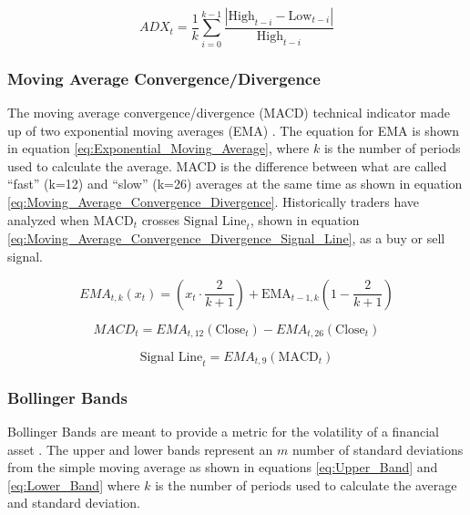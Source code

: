 \documentclass[journal]{new-aiaa}
\begin{document}
\begin{equation}\label{eq:Average_Directional_Index}
        ADX_t = \frac{1}{k} \sum_{i=0}^{k-1} \frac{\left| \text{High}_{t-i} - \text{Low}_{t-i} \right|}{\text{High}_{t-i}}
\end{equation}

\subsubsection{Moving Average Convergence/Divergence}\label{sec:Technical_Analysis:Moving_Average_Convergence_Divergence}
The moving average convergence/divergence (MACD) technical indicator made up of two exponential moving averages (EMA) \cite{appel2005technical}.
The equation for EMA is shown in equation \ref{eq:Exponential_Moving_Average}, where $k$ is the number of periods used to calculate the average.
MACD is the difference between what are called  ``fast'' (k=12) and ``slow'' (k=26) averages at the same time as shown in equation \ref{eq:Moving_Average_Convergence_Divergence}.
Historically traders have analyzed when $\text{MACD}_t$ crosses $\text{Signal Line}_t$, shown in equation \ref{eq:Moving_Average_Convergence_Divergence_Signal_Line}, as a buy or sell signal.

\begin{equation}\label{eq:Exponential_Moving_Average}
        EMA_{t,k} (x_t) = \left(x_t \cdot \frac{2}{k+1}\right) + \text{EMA}_{t-1, k} \left(1 - \frac{2}{k+1}\right)
\end{equation}

\begin{equation}\label{eq:Moving_Average_Convergence_Divergence}
        MACD_t = EMA_{t,12} (\text{Close}_t) - EMA_{t,26} (\text{Close}_t)
\end{equation}

\begin{equation}\label{eq:Moving_Average_Convergence_Divergence_Signal_Line}
        \text{Signal Line}_t = EMA_{t,9} \left( \text{MACD}_t \right)
\end{equation}

\subsubsection{Bollinger Bands}\label{sec:Technical_Analysis:Bollinger_Bands}
Bollinger Bands are meant to provide a metric for the volatility of a financial asset \cite{bollinger2002bollinger}.
The upper and lower bands represent an $m$ number of standard deviations from the simple moving average as shown in equations \ref{eq:Upper_Band} and \ref{eq:Lower_Band} where $k$ is the number of periods used to calculate the average and standard deviation.
\end{document}

